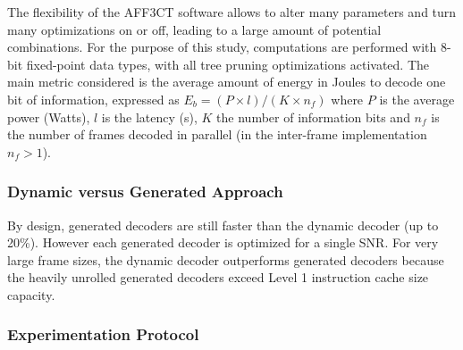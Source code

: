 The flexibility of the AFF3CT software allows to alter many parameters and turn
many optimizations on or off, leading to a large amount of potential
combinations. For the purpose of this study, computations are performed with
8-bit fixed-point data types, with all tree pruning optimizations activated. The
main metric considered is the average amount of energy in Joules to decode one
bit of information, expressed  as  $E_b = (P \times l) / (K \times n_f)$ where
$P$ is the average power (Watts), $l$ is the latency (s), $K$ the number of
information bits and $n_f$ is the number of frames decoded in parallel (in the
inter-frame implementation $n_f > 1$).

\subsubsection{Dynamic versus Generated Approach}

By design, generated decoders are still faster than the dynamic decoder
(up to 20\%). However each generated decoder is optimized for a single
SNR. For very large frame sizes, the dynamic decoder outperforms generated
decoders because the heavily unrolled generated decoders exceed Level 1
instruction cache size capacity.

\subsubsection{Experimentation Protocol}

